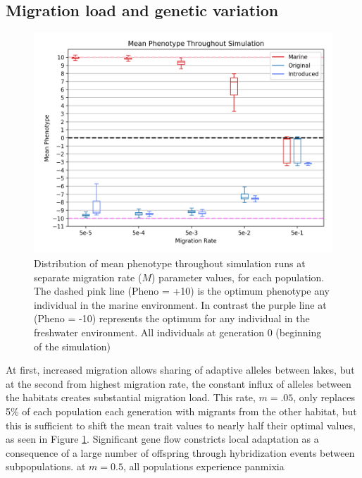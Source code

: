 \documentclass{article}
\begin{document}
\subsection*{Migration load and genetic variation}

\begin{figure}[h!tb]
	\begin{center}
  		\includegraphics[width=1.0\linewidth]{semi_final_plots/PhenoDist_semi_final.png}
  		\caption{Distribution of mean phenotype throughout simulation runs at separate migration rate ($M$) parameter values, for each population.
		The dashed pink line (Pheno = +10) is the optimum phenotype any individual in the marine environment.
		In contrast the purple line at (Pheno = -10) represents the optimum for any individual in the freshwater environment. 
		All individuals at generation 0 (beginning of the simulation) 
		}
  		\label{fig:MeanPhenotype}
	\end{center}
\end{figure}


At first, increased migration allows sharing of adaptive alleles between lakes,
but at the second from highest migration rate,
the constant influx of alleles between the habitats creates substantial migration load.
This rate, $m=.05$, only replaces 5\% of each population each generation
with migrants from the other habitat, but this is sufficient to shift the mean trait values
to nearly half their optimal values, as seen in Figure \ref{fig:MeanPhenotype}.
Significant gene flow constricts local adaptation
as a consequence of a large number of offspring through hybridization events between subpopulations.
at $m=0.5$, all populations experience panmixia 
\end{document}
